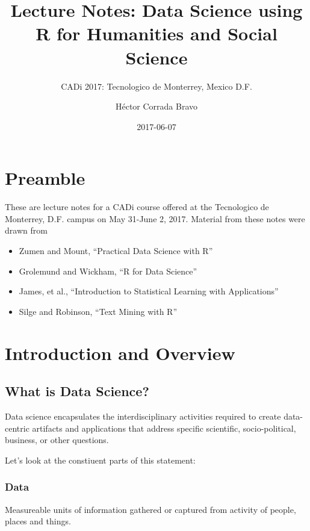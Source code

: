 \documentclass[]{book}
\title{Lecture Notes: Data Science using R for Humanities and Social Science}
\subtitle{CADi 2017: Tecnologico de Monterrey, Mexico D.F.}
\author{Héctor Corrada Bravo}
\date{2017-06-07}
\providecommand{\tightlist}{%
  \setlength{\itemsep}{0pt}\setlength{\parskip}{0pt}}
\theoremstyle{definition}
\theoremstyle{definition}
\theoremstyle{remark}
\begin{document}
\maketitle

{
\setcounter{tocdepth}{2}
\tableofcontents
}
\chapter{Preamble}\label{preamble}

These are lecture notes for a CADi course offered at the Tecnologico de
Monterrey, D.F. campus on May 31-June 2, 2017. Material from these notes
were drawn from

\begin{itemize}
\tightlist
\item
  Zumen and Mount, ``Practical Data Science with R''\\
\item
  Grolemund and Wickham, ``R for Data Science''\\
\item
  James, et al., ``Introduction to Statistical Learning with
  Applications''\\
\item
  Silge and Robinson, ``Text Mining with R''
\end{itemize}

\chapter{Introduction and Overview}\label{introduction-and-overview}

\section{What is Data Science?}\label{what-is-data-science}

Data science encapsulates the interdisciplinary activities required to
create data-centric artifacts and applications that address specific
scientific, socio-political, business, or other questions.

Let's look at the constiuent parts of this statement:

\subsection{Data}\label{data}

Measureable units of information gathered or captured from activity of
people, places and things.
\end{document}
